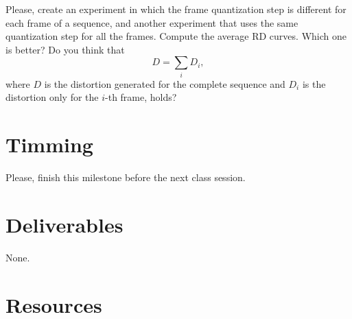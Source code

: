 Please, create an experiment in which the frame quantization step is
different for each frame of a sequence, and another experiment that
uses the same quantization step for all the frames. Compute the
average RD curves. Which one is better? Do you think that
\begin{equation*}
  D = \sum_i D_i,
\end{equation*}
where $D$ is the distortion generated for the complete sequence and
$D_i$ is the distortion only for the $i$-th frame, holds?


\section{Timming}

Please, finish this milestone before the next class session.

\section{Deliverables}

None.

\section{Resources}

\renewcommand{\addcontentsline}[3]{}%


